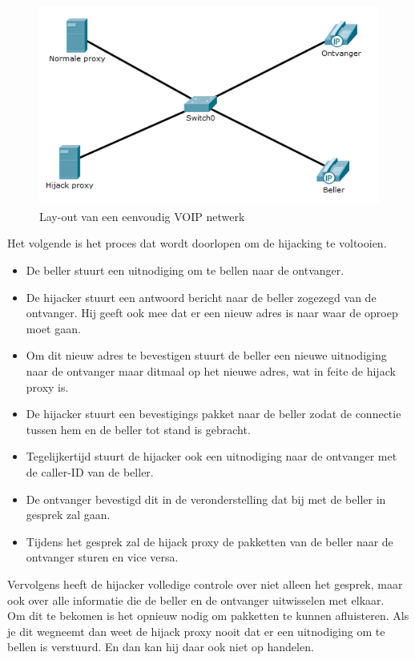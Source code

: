 \documentclass[pdftex,a4paper,12pt,twoside]{report}
\begin{document}
\begin{figure}[H]
\caption{Lay-out van een eenvoudig VOIP netwerk \protect \footnotemark}
\includegraphics[scale=0.7]{img/Hijack}
\end{figure}
Het volgende is het proces dat wordt doorlopen om de hijacking te voltooien.
\begin{itemize}
	\item De beller stuurt een uitnodiging om te bellen naar de ontvanger.
	\item De hijacker stuurt een antwoord bericht naar de beller zogezegd van de ontvanger. Hij geeft ook mee dat er een nieuw adres is naar waar de oproep moet gaan.
	\item Om dit nieuw adres te bevestigen stuurt de beller een nieuwe uitnodiging naar de ontvanger maar ditmaal op het nieuwe adres, wat in feite de hijack proxy is.
	\item De hijacker stuurt een bevestigings pakket naar de beller zodat de connectie tussen hem en de beller tot stand is gebracht. 
	\item Tegelijkertijd stuurt de hijacker ook een uitnodiging naar de ontvanger met de caller-ID van de beller.
	\item De ontvanger bevestigd dit in de veronderstelling dat bij met de beller in gesprek zal gaan.
	\item Tijdens het gesprek zal de hijack proxy de pakketten van de beller naar de ontvanger sturen en vice versa. 
\end{itemize}
\newpage
Vervolgens heeft de hijacker volledige controle over niet alleen het gesprek, maar ook over alle informatie die de beller en de ontvanger uitwisselen met elkaar. \\
Om dit te bekomen is het opnieuw nodig om pakketten te kunnen afluisteren. Als je dit wegneemt dan weet de hijack proxy nooit dat er een uitnodiging om te bellen is verstuurd. En dan kan hij daar ook niet op handelen.
\end{document}
